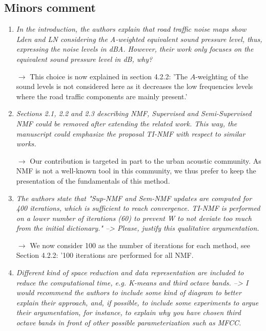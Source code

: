 \documentclass[10pt]{article}
\begin{document}
\subsection{Minors comment}

\begin{enumerate}
\item \emph{In the introduction, the authors explain that road traffic noise maps show Lden and LN considering the A-weighted equivalent sound pressure level, thus, expressing the noise levels in dBA. However, their work only focuses on the equivalent sound pressure level in dB, why? }

$\rightarrow$ This choice is now explained in section 4.2.2: 'The $A$-weighting of the sound levels is not considered here as it decreases the low frequencies levels where the road traffic components are mainly present.'

\item \emph{Sections 2.1, 2.2 and 2.3 describing NMF, Supervised and Semi-Supervised NMF could be removed after extending the related work. This way, the manuscript could emphasize the proposal TI-NMF with respect to similar works.}

$\rightarrow$ Our contribution is targeted in part to the urban acoustic community. As NMF is not a well-known tool in this community, we thus prefer to keep the presentation of the fundamentals of this method.

\item \emph{The authors state that "Sup-NMF and Sem-NMF updates are computed for 400 iterations, which is sufficient to reach convergence. TI-NMF is performed on a lower number of iterations (60) to prevent W to not deviate too much from the initial dictionary." --> Please, justify this qualitative argumentation.}

$\rightarrow$ We now consider 100 as the number of iterations for each method, see Section 4.2.2: '100 iterations are performed for all NMF.

\item \emph{Different kind of space reduction and data representation are included to reduce the computational time, e.g. K-means and third octave bands. --> I would recommend the authors to include some kind of diagram to better explain their approach, and, if possible, to include some experiments to argue their argumentation, for instance, to explain why you have chosen third octave bands in front of other possible parameterization such as MFCC.}


\end{enumerate}
\end{document}
